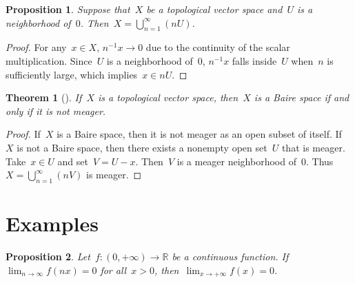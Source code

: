 \documentclass[11pt,a4paper]{article}  %
\newtheorem{theorem}{Theorem}[section]
\newtheorem{proposition}{Proposition}[section]
\theoremstyle{definition}
\def\real{\mathbb{R}}
\numberwithin{equation}{section}
\begin{document}
\begin{proposition}
  Suppose that~$X$ be a topological vector space and~$U$ is a neighborhood of~$0$.
  Then~$X=\bigcup_{n=1}^\infty (nU)$.
\end{proposition}

\begin{proof}
  For any~$x\in X$, $n^{-1} x\to 0$ due to the continuity of the scalar multiplication.
  Since~$U$ is a neighborhood of~$0$,
  $n^{-1} x$ falls inside~$U$ when~$n$ is sufficiently large, which implies~$x\in n U$.
\end{proof}

\begin{theorem}[{\cite[Theorem~11.6.7]{Narici_Beckenstein_2010}}]
  If~$X$ is a topological vector space, then~$X$ is a Baire space if and only if it is not meager.
\end{theorem}

\begin{proof}
 If~$X$ is a Baire space, then it is not meager as an open subset of itself.  If~$X$ is not a Baire
 space, then there exists a nonempty open set~$U$ that is meager. Take~$x\in U$ and set~$V=U-x$.
 Then~$V$ is a meager neighborhood of~$0$. Thus~$X=\bigcup_{n=1}^\infty (nV)$ is meager.
\end{proof}

\section{Examples}

\begin{proposition}
  Let~$f\mathrel{:} (0,+\infty)\to \real$ be a continuous function. If~$\lim_{n\to \infty}f(nx) = 0$
   for all~$x>0$, then~$\lim_{x\to +\infty} f(x) = 0$.
\end{proposition}
\end{document}
